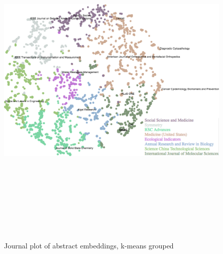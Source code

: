 \documentclass[../../Thesis.tex]{subfiles}
\begin{document}
\begin{landscape}
\begin{figure}
\begin{center}
\includegraphics[height=6.5in]{Plots/Journal_Plots/Abstract_grouped}
\end{center}
\caption{Journal plot of abstract embeddings, k-means grouped}\label{figure:abstractPlotGrouped}
\end{figure}
\end{landscape}
\end{document}

